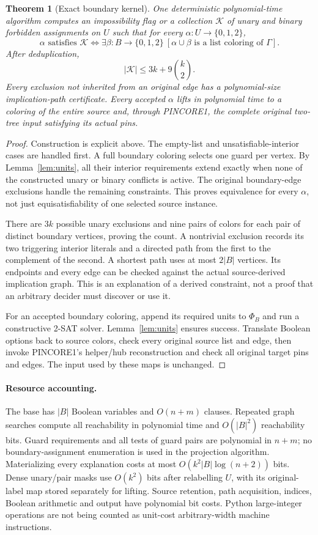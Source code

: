 \documentclass[11pt]{article}
\newtheorem{theorem}{Theorem}
\newcommand{\COL}{\{0,1,2\}}
\begin{document}
\begin{theorem}[Exact boundary kernel]\label{thm:main}
One deterministic polynomial-time algorithm computes an impossibility flag
or a collection $\mathcal K$ of unary and binary forbidden assignments on
$U$ such that for every $\alpha:U\to\COL$,
\[
 \alpha\text{ satisfies }\mathcal K
 \iff \exists\beta:B\to\COL\ [\alpha\cup\beta
                      \text{ is a list coloring of }\Gamma].
\]
After deduplication,
\[
 |\mathcal K|\le3k+9\binom{k}{2}.
\]
Every exclusion not inherited from an original edge has a polynomial-size
implication-path certificate. Every accepted $\alpha$ lifts in polynomial
time to a coloring of the entire source and, through PINCORE1, the complete
original two-tree input satisfying its actual pins.
\end{theorem}
\begin{proof}
Construction is explicit above. The empty-list and unsatisfiable-interior
cases are handled first. A full boundary coloring selects one guard per
vertex. By Lemma~\ref{lem:units}, all their interior requirements extend
exactly when none of the constructed unary or binary conflicts is active.
The original boundary-edge exclusions handle the remaining constraints.
This proves equivalence for every $\alpha$, not just equisatisfiability of
one selected source instance.

There are $3k$ possible unary exclusions and nine pairs of colors for each
pair of distinct boundary vertices, proving the count. A nontrivial exclusion
records its two triggering interior literals and a directed path from the
first to the complement of the second. A shortest path uses at most $2|B|$
vertices. Its endpoints and every edge can be checked against the actual
source-derived implication graph. This is an explanation of a derived
constraint, not a proof that an arbitrary decider must discover or use it.

For an accepted boundary coloring, append its required units to $\Phi_B$
and run a constructive 2-SAT solver. Lemma~\ref{lem:units} ensures success.
Translate Boolean options back to source colors, check every original source
list and edge, then invoke PINCORE1's helper/hub reconstruction and check
all original target pins and edges. The input used by these maps is unchanged.
\end{proof}

\paragraph{Resource accounting.}
The base has $|B|$ Boolean variables and $O(n+m)$ clauses.
Repeated graph searches compute all reachability in polynomial time and
$O(|B|^2)$ reachability bits. Guard requirements and all tests of guard pairs
are polynomial in $n+m$; no boundary-assignment enumeration is used in the
projection algorithm. Materializing every explanation costs at most
$O(k^2|B|\log(n+2))$ bits. Dense unary/pair masks use $O(k^2)$ bits after
relabelling $U$, with its original-label map stored separately for lifting.
Source retention, path acquisition, indices, Boolean arithmetic and output
have polynomial bit costs. Python large-integer operations are not being
counted as unit-cost arbitrary-width machine instructions.
\end{document}
